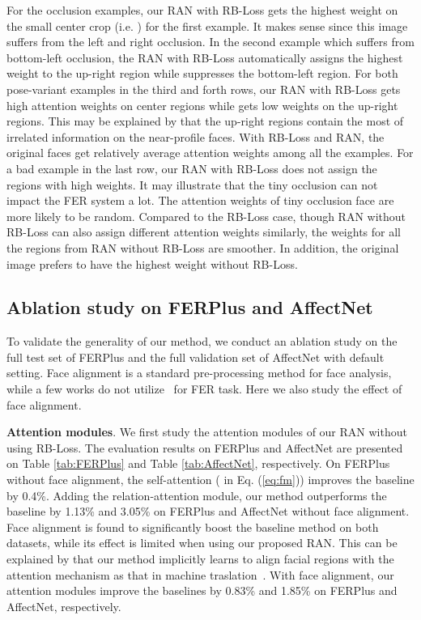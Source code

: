 \documentclass[journal]{IEEEtran}
\newcommand{\kwang}[1]{\textcolor[rgb]{0,0,0}{#1}}
\begin{document}
For the occlusion examples, our RAN with RB-Loss gets the highest weight on the small center crop (i.e. ) for the first example. It makes sense since this image suffers from the left and right occlusion. In the second example which suffers from bottom-left occlusion, the RAN with RB-Loss automatically assigns the highest weight to the up-right region while suppresses the bottom-left region. 
\kwang{For both pose-variant examples in the third and forth rows, our RAN with RB-Loss gets high attention weights on center regions while gets low weights on the up-right regions.} This may be explained by that the up-right regions contain the most of irrelated information on the near-profile faces. With RB-Loss and RAN, the original faces get relatively average attention weights among all the examples.
\kwang{For a bad example in the last row, our RAN with RB-Loss does not assign the regions with high weights. It may illustrate that the tiny occlusion can not impact the FER system a lot. The attention weights of tiny occlusion face are more likely to be random.}
Compared to the RB-Loss case, though RAN without RB-Loss can also assign different attention weights similarly, the weights for all the regions from RAN without RB-Loss are smoother. In addition, the original image prefers to have the highest weight without RB-Loss.



\subsection{Ablation study on FERPlus and AffectNet} 
To validate the generality of our method, we conduct an ablation study on the full test set of FERPlus and the full validation set of AffectNet with default setting.
Face alignment is a standard pre-processing method for face analysis, while a few works do not utilize~\cite{barsoum2016training,mollahosseini2017affectnet} for FER task. Here we also  study the effect of face alignment.

\textbf{Attention modules}. We first study the attention modules of our RAN without using RB-Loss. The evaluation results on FERPlus and AffectNet are presented on Table \ref{tab:FERPlus} and Table \ref{tab:AffectNet}, respectively. On FERPlus without face alignment, the self-attention ( in Eq. (\ref{eq:fm})) improves the baseline by 0.4\%. Adding the relation-attention module, our method outperforms the baseline by 1.13\% and 3.05\% on FERPlus and AffectNet without face alignment. Face alignment is found to significantly boost the baseline method on both datasets, while its effect is limited when using our proposed RAN. 
This can be explained by that our method implicitly learns to align facial regions with the attention mechanism as that in machine traslation~\cite{bengio}.
With face alignment, our attention modules improve the baselines by 0.83\% and 1.85\% on FERPlus and AffectNet, respectively.
\end{document}
